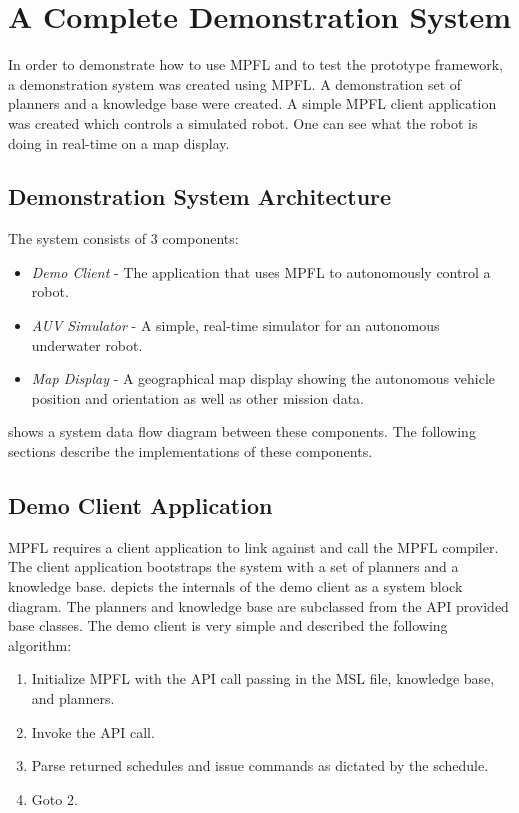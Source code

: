 
\chapter{A Complete Demonstration System}

In order to demonstrate how to use MPFL and to test the prototype framework, a demonstration system was created using MPFL. A demonstration set of planners and a knowledge base were created. A simple MPFL client application was created which controls a simulated robot. One can see what the robot is doing in real-time on a map display.

\section{Demonstration System Architecture}
The system consists of 3 components:
\begin{itemize}
\item \textit{Demo Client} - The application that uses MPFL to autonomously control a robot.
\item \textit{AUV Simulator} - A simple, real-time simulator for an autonomous underwater robot.
\item \textit{Map Display} - A geographical map display showing the autonomous vehicle position and orientation as well as other mission data.
\end{itemize}

 shows a system data flow diagram between these components. The following sections describe the implementations of these components.


\section{Demo Client Application}
MPFL requires a client application to link against and call the MPFL compiler. The client application bootstraps the system with a set of planners and a knowledge base.  depicts the internals of the demo client as a system block diagram. The planners and knowledge base are subclassed from the API provided base classes. The demo client is very simple and described the following algorithm:

\begin{enumerate}
\item Initialize MPFL with the  API call passing in the MSL file, knowledge base, and planners.
\item Invoke the  API call.
\item Parse returned schedules and issue commands as dictated by the schedule.
\item Goto 2.
\end{enumerate}

